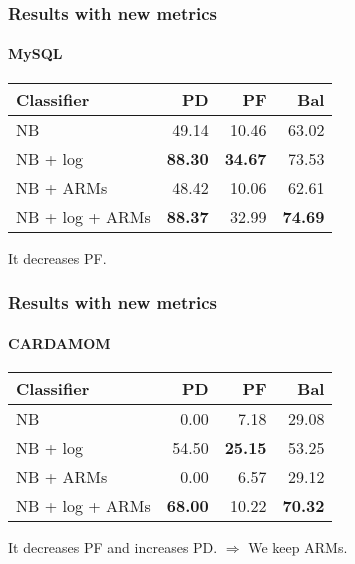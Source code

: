 \begin{frame}
 \frametitle{Results with new metrics}
 \framesubtitle{MySQL}
 \begin{center}
 \begin{tabular}{lrrr}
  \hspace{0.2cm} Classifier & PD & PF & Bal\\
  \hline
  NB & 49.14 & 10.46 & 63.02\\
  NB + log &  \textbf{88.30} & \textbf{34.67} & 73.53\\
  NB + ARMs & 48.42 & 10.06 & 62.61\\
  NB + log + ARMs & \textbf{88.37} & 32.99 & \textbf{74.69}\\
  \hline
 \end{tabular}
 \end{center}
 \vspace{0.5cm}
 It decreases PF.
\end{frame}

\begin{frame}
 \frametitle{Results with new metrics}
 \framesubtitle{CARDAMOM}
 \begin{center}
 \begin{tabular}{lrrr}
  \hspace{0.2cm} Classifier & PD & PF & Bal\\
  \hline
  NB & 0.00 & 7.18 & 29.08\\
  NB + log & 54.50 & \textbf{25.15} & 53.25\\
  NB + ARMs & 0.00 & 6.57 & 29.12\\
  NB + log + ARMs & \textbf{68.00} & 10.22 & \textbf{70.32}\\
  \hline
 \end{tabular}
 \end{center}
 \vspace{0.5cm}
 It decreases PF and increases PD. $\Longrightarrow$ \alert{We keep ARMs.}
\end{frame}
